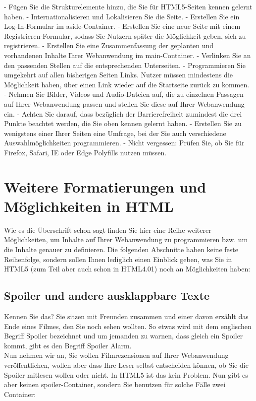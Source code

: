 -	Fügen Sie die Strukturelemente hinzu, die Sie für HTML5-Seiten kennen gelernt haben.
-	Internationalisieren und Lokalisieren Sie die Seite.
-	Erstellen Sie ein Log-In-Formular im aside-Container.
-	Erstellen Sie eine neue Seite mit einem Registrieren-Formular, sodass Sie Nutzern später die Möglichkeit geben, sich zu registrieren. 
-	Erstellen Sie eine Zusammenfassung der geplanten und vorhandenen Inhalte Ihrer Webanwendung im main-Container.
-	Verlinken Sie an den passenden Stellen auf die entsprechenden Unterseiten.
-	Programmieren Sie umgekehrt auf allen bisherigen Seiten Links. Nutzer müssen mindestens die Möglichkeit haben, über einen Link wieder auf die Startseite zurück zu kommen.
-	Nehmen Sie Bilder, Videos und Audio-Dateien auf, die zu einzelnen Passagen auf Ihrer Webanwendung passen und stellen Sie diese auf Ihrer Webanwendung ein.
-	Achten Sie darauf, dass bezüglich der Barrierefreiheit zumindest die drei Punkte beachtet werden, die Sie oben kennen gelernt haben.
-	Erstellen Sie zu wenigstens einer Ihrer Seiten eine Umfrage, bei der Sie auch verschiedene Auswahlmöglichkeiten programmieren.
-	Nicht vergessen: Prüfen Sie, ob Sie für Firefox, Safari, IE oder Edge Polyfills nutzen müssen.

\section{Weitere Formatierungen und Möglichkeiten in HTML}

Wie es die Überschrift schon sagt finden Sie hier eine Reihe weiterer Möglichkeiten, um Inhalte auf Ihrer Webanwendung zu programmieren bzw. um die Inhalte genauer zu definieren. Die folgenden Abschnitte haben keine feste Reihenfolge, sondern sollen Ihnen lediglich einen Einblick geben, was Sie in HTML5 (zum Teil aber auch schon in HTML4.01) noch an Möglichkeiten haben:

\subsection{Spoiler und andere ausklappbare Texte}

Kennen Sie das? Sie sitzen mit Freunden zusammen und einer davon erzählt das Ende eines Filmes, den Sie noch sehen wollten. So etwas wird mit dem englischen Begriff Spoiler bezeichnet und um jemanden zu warnen, dass gleich ein Spoiler kommt, gibt es den Begriff Spoiler Alarm.\\

Nun nehmen wir an, Sie wollen Filmrezensionen auf Ihrer Webanwendung veröffentlichen, wollen aber dass Ihre Leser selbst entscheiden können, ob Sie die Spoiler mitlesen wollen oder nicht. In HTML5 ist das kein Problem. Nun gibt es aber keinen spoiler-Container, sondern Sie benutzen für solche Fälle zwei Container:\\

